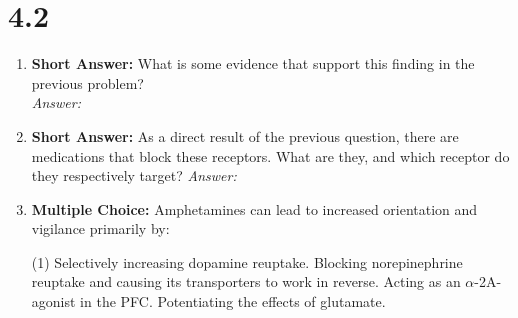 \section*{4.2}
\begin{enumerate}[label=\textbf{Q4.2.\arabic*}]
    

    \item \textbf{Short Answer:} What is some evidence that support this finding in the previous problem? \\
          \textit{Answer:} \\ %



    \item \textbf{Short Answer:} As a direct result of the previous question, there are medications that block these receptors. What are they, and which receptor do they respectively target?
          \textit{Answer:} \\ %

        \item \textbf{Multiple Choice:} Amphetamines can lead to increased orientation and vigilance primarily by:
    \begin{tasks}[label=\textcolor{\documentTheme}{(\Alph*)}, item-format=\color{\documentTheme}, label-width=1.5em, item-indent=1.7em](1)
        \task Selectively increasing dopamine reuptake.
        \task Blocking norepinephrine reuptake and causing its transporters to work in reverse.
        \task Acting as an \(\alpha\)-2A-agonist in the PFC.
        \task Potentiating the effects of glutamate.
    \end{tasks}


\end{enumerate}
